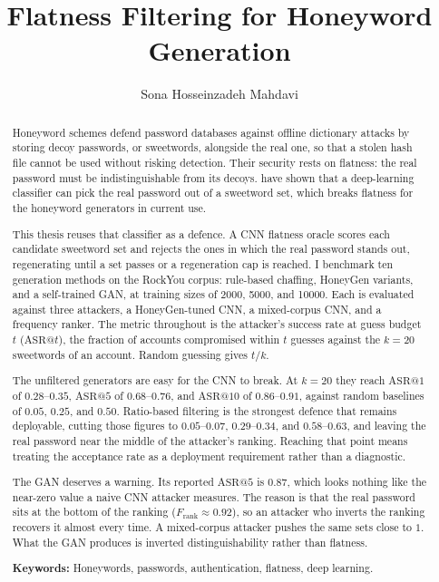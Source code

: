 \documentclass{masterthesis_ceng}
\begin{document}
\title{ Flatness Filtering for Honeyword Generation }
\author{Sona Hosseinzadeh Mahdavi} 
 



\maketitle
\begin{abstract}
Honeyword schemes defend password databases against offline dictionary
attacks by storing decoy passwords, or sweetwords, alongside the real
one, so that a stolen hash file cannot be used without risking
detection. Their security rests on flatness: the real password must be
indistinguishable from its decoys. \textcite{dani2024passfilter} have
shown that a deep-learning classifier can pick the real password out of
a sweetword set, which breaks flatness for the honeyword generators in
current use.

This thesis reuses that classifier as a defence. A CNN flatness oracle
scores each candidate sweetword set and rejects the ones in which the
real password stands out, regenerating until a set passes or a
regeneration cap is reached. I benchmark ten generation methods on the
RockYou corpus: rule-based chaffing, HoneyGen variants, and a
self-trained GAN, at training sizes of 2000, 5000, and 10000. Each is
evaluated against three attackers, a HoneyGen-tuned CNN, a mixed-corpus
CNN, and a frequency ranker. The metric throughout is the attacker's
success rate at guess budget $t$ ($\mathrm{ASR}@t$), the fraction of
accounts compromised within $t$ guesses against the $k = 20$ sweetwords
of an account. Random guessing gives $t/k$.

The unfiltered generators are easy for the CNN to break. At $k = 20$
they reach $\mathrm{ASR}@1$ of $0.28$--$0.35$, $\mathrm{ASR}@5$ of
$0.68$--$0.76$, and $\mathrm{ASR}@10$ of $0.86$--$0.91$, against random
baselines of $0.05$, $0.25$, and $0.50$. Ratio-based filtering is the
strongest defence that remains deployable, cutting those figures to
$0.05$--$0.07$, $0.29$--$0.34$, and $0.58$--$0.63$, and leaving the real
password near the middle of the attacker's ranking. Reaching that point
means treating the acceptance rate as a deployment requirement rather
than a diagnostic.

The GAN deserves a warning. Its reported $\mathrm{ASR}@5$ is $0.87$,
which looks nothing like the near-zero value a naive CNN attacker
measures. The reason is that the real password sits at the bottom of the
ranking ($F_{\text{rank}} \approx 0.92$), so an attacker who inverts the
ranking recovers it almost every time. A mixed-corpus attacker pushes
the same sets close to $1$. What the GAN produces is inverted
distinguishability rather than flatness.


\medskip
\noindent\textbf{Keywords:} Honeywords, passwords, authentication,
flatness, deep learning.
\end{abstract}
\end{document}
